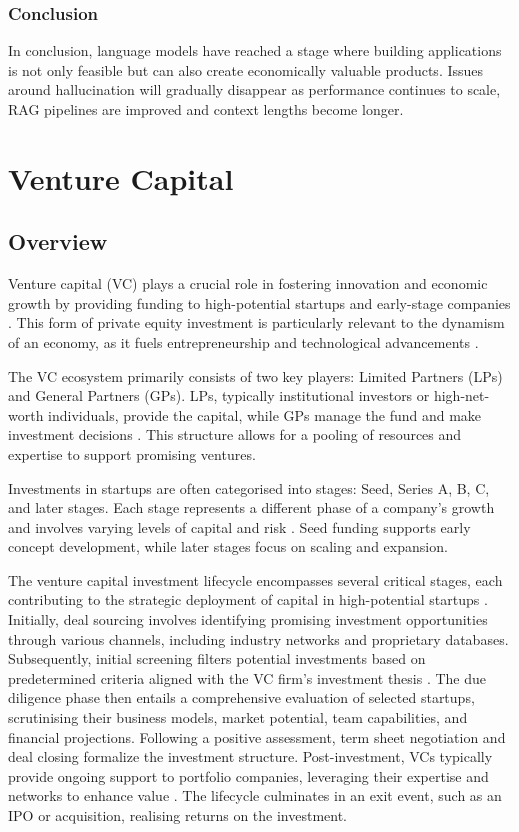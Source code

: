 \documentclass[a4paper, oneside]{discothesis}
\begin{document}
\subsection{Conclusion}
In conclusion, language models have reached a stage where building applications is not only feasible but can also create economically valuable products. Issues around hallucination will gradually disappear as performance continues to scale, RAG pipelines are improved and context lengths become longer.

\chapter{Venture Capital}
\section{Overview}
Venture capital (VC) plays a crucial role in fostering innovation and economic growth by providing funding to high-potential startups and early-stage companies \cite{gompers2001venture}. This form of private equity investment is particularly relevant to the dynamism of an economy, as it fuels entrepreneurship and technological advancements \cite{kortum2000assessing_contribution_venture_capital}.

The VC ecosystem primarily consists of two key players: Limited Partners (LPs) and General Partners (GPs). LPs, typically institutional investors or high-net-worth individuals, provide the capital, while GPs manage the fund and make investment decisions \cite{metrick2010venture}. This structure allows for a pooling of resources and expertise to support promising ventures.

Investments in startups are often categorised into stages: Seed, Series A, B, C, and later stages. Each stage represents a different phase of a company's growth and involves varying levels of capital and risk \cite{hellmann2002venture}. Seed funding supports early concept development, while later stages focus on scaling and expansion.

The venture capital investment lifecycle encompasses several critical stages, each contributing to the strategic deployment of capital in high-potential startups \cite{gompers2004venture}. Initially, deal sourcing involves identifying promising investment opportunities through various channels, including industry networks and proprietary databases. Subsequently, initial screening filters potential investments based on predetermined criteria aligned with the VC firm's investment thesis \cite{petty2011}. The due diligence phase then entails a comprehensive evaluation of selected startups, scrutinising their business models, market potential, team capabilities, and financial projections. Following a positive assessment, term sheet negotiation and deal closing formalize the investment structure. Post-investment, VCs typically provide ongoing support to portfolio companies, leveraging their expertise and networks to enhance value \cite{sapienza1996venture}. The lifecycle culminates in an exit event, such as an IPO or acquisition, realising returns on the investment.
\end{document}
